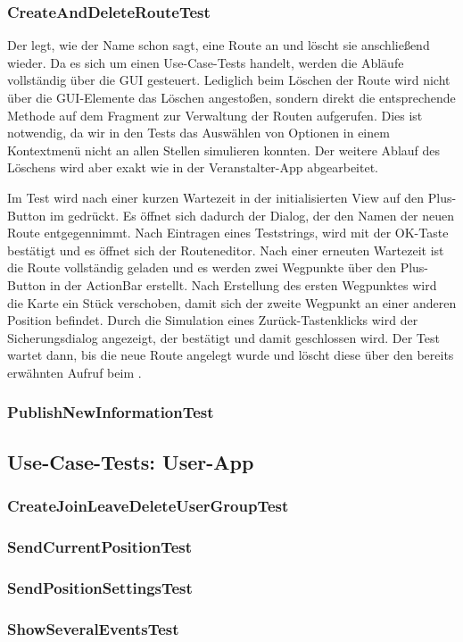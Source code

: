 \subsubsection{CreateAndDeleteRouteTest}
Der  legt, wie der Name schon sagt, eine Route an und löscht sie anschließend wieder. Da es sich um einen Use-Case-Tests handelt, werden die Abläufe vollständig über die GUI gesteuert. Lediglich beim Löschen der Route wird nicht über die GUI-Elemente das Löschen angestoßen, sondern direkt die entsprechende Methode auf dem Fragment zur Verwaltung der Routen aufgerufen. Dies ist notwendig, da wir in den Tests das Auswählen von Optionen in einem Kontextmenü nicht an allen Stellen simulieren konnten. Der weitere Ablauf des Löschens wird aber exakt wie in der Veranstalter-App abgearbeitet.

Im Test wird nach einer kurzen Wartezeit in der initialisierten View auf den Plus-Button im  gedrückt. Es öffnet sich dadurch der Dialog, der den Namen der neuen Route entgegennimmt. Nach Eintragen eines Teststrings, wird mit der OK-Taste bestätigt und es öffnet sich der Routeneditor. Nach einer erneuten Wartezeit ist die Route vollständig geladen und es werden zwei Wegpunkte über den Plus-Button in der ActionBar erstellt. Nach Erstellung des ersten Wegpunktes wird die Karte ein Stück verschoben, damit sich der zweite Wegpunkt an einer anderen Position befindet. Durch die Simulation eines Zurück-Tastenklicks wird der Sicherungsdialog angezeigt, der bestätigt und damit geschlossen wird. Der Test wartet dann, bis die neue Route angelegt wurde und löscht diese über den bereits erwähnten Aufruf beim .

\subsubsection{PublishNewInformationTest}

\subsection{Use-Case-Tests: User-App}
\subsubsection{CreateJoinLeaveDeleteUserGroupTest}

\subsubsection{SendCurrentPositionTest}

\subsubsection{SendPositionSettingsTest}

\subsubsection{ShowSeveralEventsTest}
